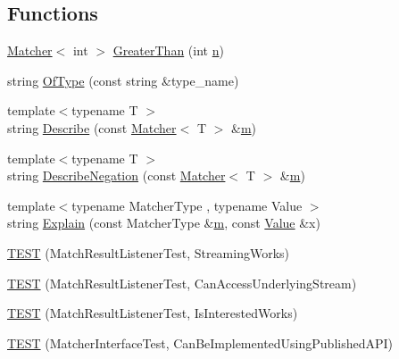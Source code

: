 \subsection*{Functions}
\begin{DoxyCompactItemize}
\item 
\hyperlink{classtesting_1_1Matcher}{Matcher}$<$ int $>$ \hyperlink{namespacetesting_1_1gmock__matchers__test_a8cf8614a7c9adc8fb00e8af04895f97c}{Greater\+Than} (int \hyperlink{app_2main_8cpp_acfc02ec89670db29251fda6a66602ce2}{n})
\item 
string \hyperlink{namespacetesting_1_1gmock__matchers__test_a5d48d2ef7ca374de369c5f0a30e32343}{Of\+Type} (const string \&type\+\_\+name)
\item 
{\footnotesize template$<$typename T $>$ }\\string \hyperlink{namespacetesting_1_1gmock__matchers__test_a36ae44e4f6c8e9fe3fe9162132503717}{Describe} (const \hyperlink{classtesting_1_1Matcher}{Matcher}$<$ T $>$ \&\hyperlink{app_2main_8cpp_a0d2d8836216fc94b61aa0824eb239db2}{m})
\item 
{\footnotesize template$<$typename T $>$ }\\string \hyperlink{namespacetesting_1_1gmock__matchers__test_afbc8022da5a58aa467ec414ab3e90908}{Describe\+Negation} (const \hyperlink{classtesting_1_1Matcher}{Matcher}$<$ T $>$ \&\hyperlink{app_2main_8cpp_a0d2d8836216fc94b61aa0824eb239db2}{m})
\item 
{\footnotesize template$<$typename Matcher\+Type , typename Value $>$ }\\string \hyperlink{namespacetesting_1_1gmock__matchers__test_a6215aeb6213a03f4233924ef1c74d968}{Explain} (const Matcher\+Type \&\hyperlink{app_2main_8cpp_a0d2d8836216fc94b61aa0824eb239db2}{m}, const \hyperlink{namespacetesting_ae44c50a3a7f0a46f05c8a0b0592b4a62}{Value} \&x)
\item 
\hyperlink{namespacetesting_1_1gmock__matchers__test_a7bc21ec910c3861034d1336fecfcc260}{T\+E\+ST} (Match\+Result\+Listener\+Test, Streaming\+Works)
\item 
\hyperlink{namespacetesting_1_1gmock__matchers__test_abc02b215e80c57464c83abdf297b9db7}{T\+E\+ST} (Match\+Result\+Listener\+Test, Can\+Access\+Underlying\+Stream)
\item 
\hyperlink{namespacetesting_1_1gmock__matchers__test_ac7ee3826ca24c20fa2a8b388c72eedb2}{T\+E\+ST} (Match\+Result\+Listener\+Test, Is\+Interested\+Works)
\item 
\hyperlink{namespacetesting_1_1gmock__matchers__test_a2d73acaddb6b28a827ce0e475ffc9cde}{T\+E\+ST} (Matcher\+Interface\+Test, Can\+Be\+Implemented\+Using\+Published\+A\+PI)

\end{DoxyCompactItemize}
